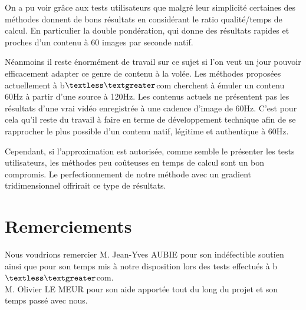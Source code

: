 \documentclass[fleqn,10pt]{SelfArx} %
\newcommand{\bcom}{b$\textless\textgreater$com\xspace}
\begin{document}
On a pu voir grâce aux tests utilisateurs que malgré leur simplicité certaines des méthodes donnent de bons résultats en considérant le ratio qualité/temps de calcul. En particulier la double pondération, qui donne des résultats rapides et proches d'un contenu à 60 images par seconde natif.

Néanmoins il reste énormément de travail sur ce sujet si l'on veut un jour pouvoir efficacement adapter ce genre de contenu à la volée. Les méthodes proposées actuellement à \bcom cherchent à émuler un contenu 60Hz à partir d'une source à 120Hz. Les contenus actuels ne présentent pas les résultats d'une vrai vidéo enregistrée à une cadence d'image de 60Hz. C'est pour cela qu'il reste du travail à faire en terme de développement technique afin de se rapprocher le plus possible d'un contenu natif, légitime et authentique à 60Hz.

Cependant, si l'approximation est autorisée, comme semble le présenter les tests utilisateurs, les méthodes peu coûteuses en temps de calcul sont un bon compromis.
Le perfectionnement de notre méthode avec un gradient tridimensionnel offrirait ce type de résultats.
\section*{Remerciements} %


Nous voudrions remercier M. Jean-Yves AUBIE pour son indéfectible soutien ainsi que pour son temps mis à notre disposition lors des tests effectués à \bcom.\\

M. Olivier LE MEUR pour son aide apportée tout du long du projet et son temps passé avec nous.




\end{document}
